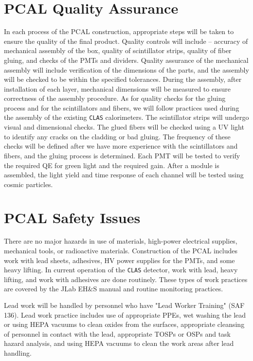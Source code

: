 \section{PCAL Quality Assurance}

In each process of the PCAL construction, appropriate steps will be taken
to ensure the quality of the final product.  Quality controls will
include -- accuracy of mechanical assembly of the box, quality of
scintillator strips, quality of fiber gluing, and checks of the PMTs and 
dividers.  Quality assurance of the mechanical assembly will include 
verification of the dimensions of the parts, and the assembly will be
checked to be within the specified tolerances.  During the assembly, 
after installation of each layer, mechanical dimensions will be measured 
to ensure correctness of the assembly procedure.  As for quality checks 
for the gluing process and for the scintillators and fibers, we will 
follow practices used during the assembly of the existing {\tt CLAS}
calorimeters.  The scintillator strips will undergo visual and dimensional 
checks.  The glued fibers will be checked using a UV light to identify 
any cracks on the cladding or bad gluing. The frequency of these checks 
will be defined after we have more experience with the scintillators and
fibers, and the gluing process is determined.  Each PMT will be tested to 
verify the required QE for green light and the required gain.  After a 
module is assembled, the light yield and time response of each channel will 
be tested using cosmic particles.

\section{PCAL Safety Issues}

There are no major hazards in use of materials, high-power electrical 
supplies, mechanical tools, or radioactive materials.  Construction of 
the PCAL includes work with lead sheets, adhesives, HV power supplies 
for the PMTs, and some heavy lifting. In current operation of the 
{\tt CLAS} detector, work with lead, heavy lifting, and work with adhesives 
are done routinely. These types of work practices are covered by the
JLab EH\&S manual and routine monitoring practices.

Lead work will be handled by personnel who have "Lead Worker Training"
(SAF 136). Lead work practice includes use of appropriate PPEs, wet washing 
the lead or using HEPA vacuums to clean oxides from the surfaces, 
appropriate cleansing of personnel in contact with the lead, appropriate
TOSPs or OSPs and task hazard analysis, and using HEPA vacuums to clean 
the work areas after lead handling.

